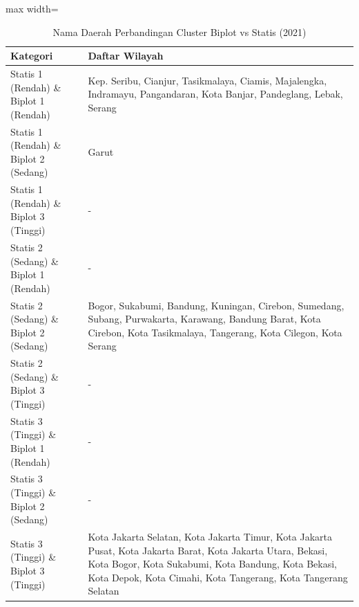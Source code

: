\begin{table}[H]
\centering
\caption{Nama Daerah Perbandingan Cluster Biplot vs Statis (2021)} \label{tab:appbiplot_statis_name_2021}
\begin{adjustbox}{max width=\textwidth}
\begin{tabular}{|p{4cm}|p{10cm}|}
\hline
\textbf{Kategori} & \textbf{Daftar Wilayah} \\
\hline
Statis 1 (Rendah) \& Biplot 1 (Rendah) & Kep. Seribu, Cianjur, Tasikmalaya, Ciamis, Majalengka, Indramayu, Pangandaran, Kota Banjar, Pandeglang, Lebak, Serang \\
\hline
Statis 1 (Rendah) \& Biplot 2 (Sedang) & Garut \\
\hline
Statis 1 (Rendah) \& Biplot 3 (Tinggi) & - \\
\hline
Statis 2 (Sedang) \& Biplot 1 (Rendah) & - \\
\hline
Statis 2 (Sedang) \& Biplot 2 (Sedang) & Bogor, Sukabumi, Bandung, Kuningan, Cirebon, Sumedang, Subang, Purwakarta, Karawang, Bandung Barat, Kota Cirebon, Kota Tasikmalaya, Tangerang, Kota Cilegon, Kota Serang \\
\hline
Statis 2 (Sedang) \& Biplot 3 (Tinggi) & - \\
\hline
Statis 3 (Tinggi) \& Biplot 1 (Rendah) & - \\
\hline
Statis 3 (Tinggi) \& Biplot 2 (Sedang) & - \\
\hline
Statis 3 (Tinggi) \& Biplot 3 (Tinggi) & Kota Jakarta Selatan, Kota Jakarta Timur, Kota Jakarta Pusat, Kota Jakarta Barat, Kota Jakarta Utara, Bekasi, Kota Bogor, Kota Sukabumi, Kota Bandung, Kota Bekasi, Kota Depok, Kota Cimahi, Kota Tangerang, Kota Tangerang Selatan \\
\hline
\end{tabular}
\end{adjustbox}
\end{table}